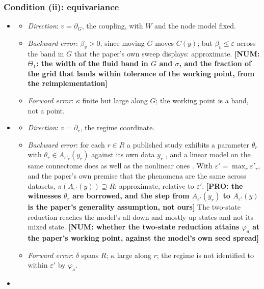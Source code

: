 \documentclass[11pt]{article}
\newcommand{\NUM}[1]{\textcolor{red!70!black}{\textbf{[NUM: #1]}}}
\newcommand{\PRO}[1]{\textcolor{blue!55!black}{\textbf{[PRO: #1]}}}
\begin{document}
\subsubsection{Condition (ii): equivariance}
\begin{itemize}
\item[$\Theta_1$]
  \begin{itemize}
  \item \emph{Direction}: $v=\partial_G$, the coupling, with $W$ and the node model fixed.
  \item \emph{Backward error}: $\beta_v>0$, since moving $G$ moves $C(y)$; but $\beta_v\le\varepsilon$ across the band in $G$ that the paper's own sweep displays: approximate. \NUM{$\Theta_1$: the width of the fluid band in $G$ and $\sigma$, and the fraction of the grid that lands within tolerance of the working point, from the reimplementation}
  \item \emph{Forward error}: $\kappa$ finite but large along $G$; the working point is a band, not a point.
  \end{itemize}
\item[$\Theta_2$]
  \begin{itemize}
  \item \emph{Direction}: $v=\partial_r$, the regime coordinate.
  \item \emph{Backward error}: for each $r\in R$ a published study exhibits a parameter $\theta_r$ with $\theta_r\in A_{\varepsilon'_r}(y_r)$ against its own data $y_r$ \parencite{hansen2015,deco2017,messe2015}, and a linear model on the same connectome does as well as the nonlinear ones \parencite{messe2014,messe2015}. With $\varepsilon'=\max_r\varepsilon'_r$, and the paper's own premise that the phenomena are the same across datasets, $\pi(A_{\varepsilon'}(y))\supseteq R$: approximate, relative to $\varepsilon'$. \PRO{the witnesses $\theta_r$ are borrowed, and the step from $A_{\varepsilon'}(y_r)$ to $A_{\varepsilon'}(y)$ is the paper's generality assumption, not ours} The two-state reduction reaches the model's all-down and mostly-up states and not its mixed state. \NUM{whether the two-state reduction attains $\varphi_a$ at the paper's working point, against the model's own seed spread}
  \item \emph{Forward error}: $\delta$ spans $R$; $\kappa$ large along $r$; the regime is not identified to within $\varepsilon'$ by $\varphi_a$.
  \end{itemize}
\item[$\Theta_3$]
  \begin{itemize}

\end{itemize}
\end{itemize}
\end{document}
